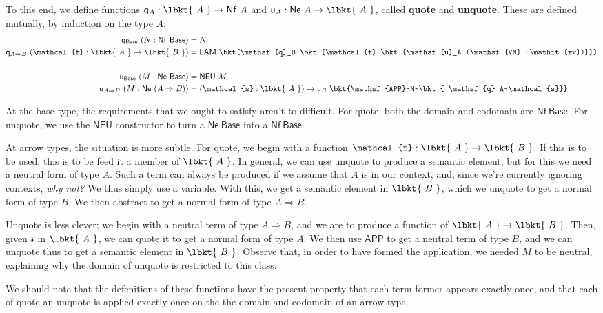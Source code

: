 To this end, we define functions  $\mathsf{q}_A : \lbkt{~A~} \to \mathsf{Nf}~A$
and $\mathsf{u}_A : \mathsf{Ne}~A \to \lbkt{~A~}$, called \textbf{quote} and
\textbf{unquote}. These are defined mutually, by induction on the type $A$:
\begin{align*}
\mathsf{q}_\mathsf{Base}~(N : \mathsf{Nf}~\mathsf{Base}) &= N \\
\mathsf{q}_{A \Rightarrow B} ~ (\mathcal{f} : \lbkt{~A~} \to \lbkt{~B~}) &=
\mathsf{LAM}~\bkt{\mathsf{q}_B~\bkt{\mathcal{f}~\bkt{\mathsf{u}_A~(\mathsf{VN}
~\mathit{zv})}}} \\
\\
\mathsf{u}_\mathsf{Base}~(M : \mathsf{Ne}~\mathsf{Base}) &= \mathsf{NEU}~M \\
\mathsf{u}_{A \Rightarrow B}~(M : \mathsf{Ne}~(A \Rightarrow B)) &=
(\mathcal{s} : \lbkt{~A~}) \mapsto \mathsf{u}_B~\bkt{\mathsf{APP}~M~\bkt{
\mathsf{q}_A~\mathcal{s}}}
\end{align*}

At the base type, the requirements that we ought to satisfy aren't to difficult.
For quote, both the domain and codomain are $\mathsf{Nf}~\mathsf{Base}$. For
unquote, we use the $\mathsf{NEU}$ constructor to turn a $\mathsf{Ne}
~\mathsf{Base}$ into a $\mathsf{Nf}~\mathsf{Base}$.

At arrow types, the situation is more subtle. For quote, we begin with a
function $\mathcal{f} : \lbkt{~A~} \to \lbkt{~B~}$. If this is to be used, this
is to be feed it a member of $\lbkt{~A~}$. In general, we can use unquote to
produce a semantic element, but for this we need a neutral form of type $A$.
Such a term can always be produced if we assume that $A$ is in our context, and,
since we're currently ignoring contexts, \emph{why not?} We thus simply use a
variable. With this, we get a semantic element in $\lbkt{~B~}$, which we unquote
to get a normal form of type $B$. We then abstract to get a normal form of type
$A \Rightarrow B$.

Unquote is less clever; we begin with a neutral term of type $A \Rightarrow B$,
and we are to produce a function of $\lbkt{~A~} \to \lbkt{~B~}$. Then, given
$\mathcal{s}$ in $\lbkt{~A~}$, we can quote it to get a normal form of type $A$.
We then use $\mathsf{APP}$ to get a neutral term of type $B$, and we can unquote
thus to get a semantic element in $\lbkt{~B~}$. Observe that, in order to have
formed the application, we needed $M$ to be neutral, explaining why the domain
of unquote is restricted to this class.

We should note that the defenitions of these functions have the present property
that each term former appears exactly once, and that each of quote an unquote
is applied exactly once on the the domain and codomain of an arrow type.

